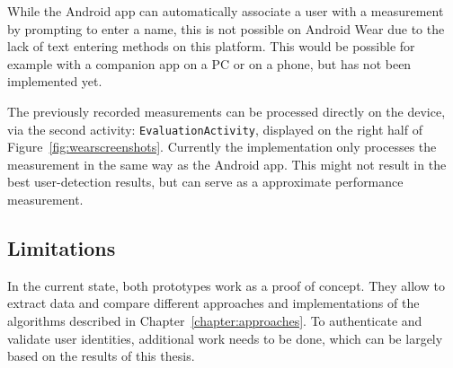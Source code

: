 While the Android \gls{app} can automatically associate a user with a measurement by prompting to enter a name, this is not possible on Android Wear due to the lack of text entering methods on this platform. This would be possible for example with a companion \gls{app} on a PC or on a phone, but has not been implemented yet.

The previously recorded measurements can be processed directly on the device, via the second \gls{activity}: \lstinline$EvaluationActivity$, displayed on the right half of Figure~\ref{fig:wearscreenshots}. Currently the implementation only processes the measurement in the same way as the Android \gls{app}. This might not result in the best user-detection results, but can serve as a approximate performance measurement.

\subsection{Limitations}
In the current state, both prototypes work as a proof of concept. They allow to extract data and compare different approaches and implementations of the algorithms described in Chapter~\ref{chapter:approaches}. To authenticate and validate user identities, additional work needs to be done, which can be largely based on the results of this thesis.

